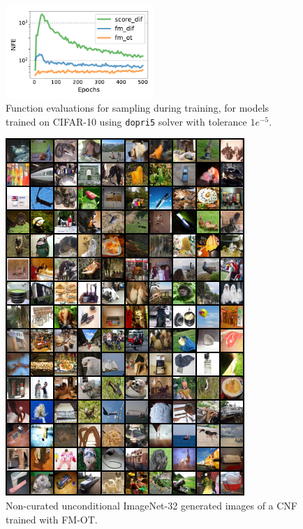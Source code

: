 \documentclass{article}
\begin{document}
\begin{figure}
  \begin{center} 
      \includegraphics[width=0.5\textwidth]{figures/plots/nfe_vs_epochs_cifar.pdf} 
  \end{center}
  \caption{Function evaluations for sampling during training, for models trained on CIFAR-10 using \texttt{dopri5} solver with tolerance $1e^{-5}$.}
  \label{fig:2d_NFE_vs_epochs}
\end{figure}
%


\begin{figure}
    \centering
    \includegraphics[width=\textwidth]{figures/imagenet32/imagenet32_samples.png}
    \caption{Non-curated unconditional ImageNet-32 generated images of a CNF trained with FM-OT. }
    \label{fig:imagenet32_samples}
\end{figure}
\end{document}
